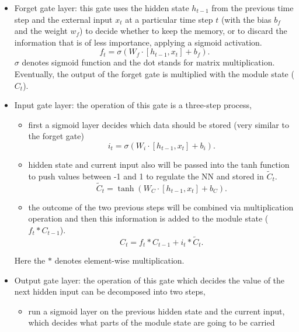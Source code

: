 \documentclass[a4paper,aps,amsmath,amssymb,twocolumn,longbibliography,,accepted=2022-05-17]{quantumarticle}
\begin{document}
\begin{itemize}
	\item{Forget gate layer: this gate uses the hidden state $h_{t-1}$ from the previous time step and the external input $x_t$ at a particular time step $t$ (with the bias $b_f$ and the weight $w_f$) to decide whether to keep the memory, or to discard the information that is of less importance, applying a sigmoid activation.
		\begin{equation}
			f_{t}=\sigma\left(W_{f} \cdot\left[h_{t-1}, x_{t}\right]+b_{f}\right).
		\end{equation}
		$\sigma$ denotes sigmoid function and the dot stands for matrix multiplication. Eventually, the output of the forget gate is multiplied with the module state ($C_t$).}
	\item{Input gate layer: the operation of this gate is a three-step process,
		\begin{itemize}
			\item{first a sigmoid layer decides which data should be stored (very similar to the forget gate) %
				\begin{equation}
					i_{t} =\sigma\left(W_{i} \cdot\left[h_{t-1}, x_{t}\right]+b_{i}\right).
				\end{equation}}
			\item{hidden state and current input also will be passed into the tanh function to push values between -1 and 1 to regulate the NN and stored in $\tilde {C}_t$.
				\begin{equation}
					\tilde{C}_{t}=\tanh \left(W_{C} \cdot\left[h_{t-1}, x_{t}\right]+b_{C}\right).
				\end{equation}}
			\item{ the outcome of the two previous steps will be combined via multiplication operation and then this information is added to the module state ($f_{t} * C_{t-1}$).
				\begin{equation}
					C_{t}=f_{t} * C_{t-1}+i_{t} * \tilde{C}_{t}.
				\end{equation}}
		\end{itemize}
		Here the $*$ denotes element-wise multiplication.}
	\item{Output gate layer: the operation of this gate which decides the value of the next hidden input can be decomposed into two steps,
		\begin{itemize}
			\item{run a sigmoid layer on the previous hidden state and the current input, which decides what parts of the module state are going to be carried
}
\end{itemize}}
\end{itemize}
\end{document}
